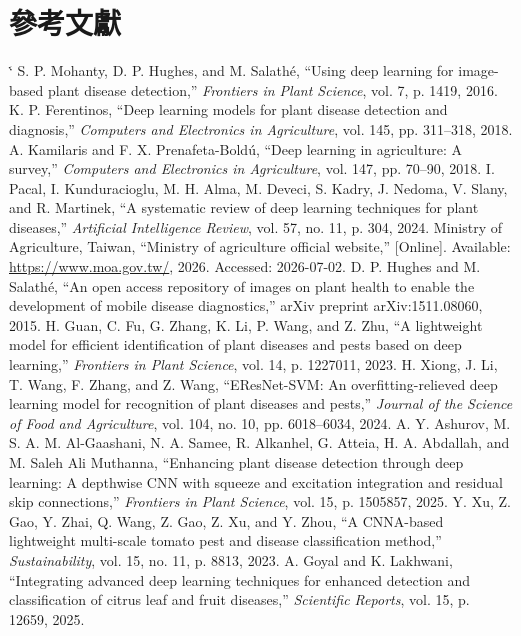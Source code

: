 \documentclass[10pt,twocolumn,a4paper]{article}
\makeatletter
\renewenvironment{thebibliography}[1]
  {\section{參考文獻}%
   \list{\@biblabel{\@arabic\c@enumiv}}%
        {\settowidth\labelwidth{\@biblabel{#1}}%
         \leftmargin\labelwidth
         \advance\leftmargin\labelsep
         \usecounter{enumiv}%
         \let\p@enumiv\@empty
         \renewcommand\theenumiv{\@arabic\c@enumiv}%
         \setlength{\itemsep}{0pt}\setlength{\parsep}{0pt}}%
   \setstretch{1}\fontsize{10}{12}\selectfont\sloppy
   \clubpenalty4000\@clubpenalty\clubpenalty
   \widowpenalty4000\sfcode`\.\@m}
  {\def\@noitemerr{\@latex@warning{Empty `thebibliography' environment}}%
   \endlist}
\makeatother
\begin{document}
\begin{thebibliography}{23}
 S. P. Mohanty, D. P. Hughes, and M. Salathé, ``Using deep learning for image-based plant disease detection,'' \textit{Frontiers in Plant Science}, vol. 7, p. 1419, 2016.
 K. P. Ferentinos, ``Deep learning models for plant disease detection and diagnosis,'' \textit{Computers and Electronics in Agriculture}, vol. 145, pp. 311--318, 2018.
 A. Kamilaris and F. X. Prenafeta-Boldú, ``Deep learning in agriculture: A survey,'' \textit{Computers and Electronics in Agriculture}, vol. 147, pp. 70--90, 2018.
 I. Pacal, I. Kunduracioglu, M. H. Alma, M. Deveci, S. Kadry, J. Nedoma, V. Slany, and R. Martinek, ``A systematic review of deep learning techniques for plant diseases,'' \textit{Artificial Intelligence Review}, vol. 57, no. 11, p. 304, 2024.
 Ministry of Agriculture, Taiwan, ``Ministry of agriculture official website,'' [Online]. Available: \url{https://www.moa.gov.tw/}, 2026. Accessed: 2026-07-02.
 D. P. Hughes and M. Salathé, ``An open access repository of images on plant health to enable the development of mobile disease diagnostics,'' arXiv preprint arXiv:1511.08060, 2015.
 H. Guan, C. Fu, G. Zhang, K. Li, P. Wang, and Z. Zhu, ``A lightweight model for efficient identification of plant diseases and pests based on deep learning,'' \textit{Frontiers in Plant Science}, vol. 14, p. 1227011, 2023.
 H. Xiong, J. Li, T. Wang, F. Zhang, and Z. Wang, ``EResNet-SVM: An overfitting-relieved deep learning model for recognition of plant diseases and pests,'' \textit{Journal of the Science of Food and Agriculture}, vol. 104, no. 10, pp. 6018--6034, 2024.
 A. Y. Ashurov, M. S. A. M. Al-Gaashani, N. A. Samee, R. Alkanhel, G. Atteia, H. A. Abdallah, and M. Saleh Ali Muthanna, ``Enhancing plant disease detection through deep learning: A depthwise CNN with squeeze and excitation integration and residual skip connections,'' \textit{Frontiers in Plant Science}, vol. 15, p. 1505857, 2025.
 Y. Xu, Z. Gao, Y. Zhai, Q. Wang, Z. Gao, Z. Xu, and Y. Zhou, ``A CNNA-based lightweight multi-scale tomato pest and disease classification method,'' \textit{Sustainability}, vol. 15, no. 11, p. 8813, 2023.
 A. Goyal and K. Lakhwani, ``Integrating advanced deep learning techniques for enhanced detection and classification of citrus leaf and fruit diseases,'' \textit{Scientific Reports}, vol. 15, p. 12659, 2025.

\end{thebibliography}
\end{document}

